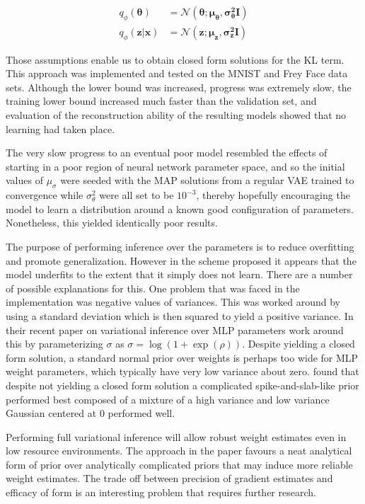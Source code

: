 \documentclass[../report.tex]{subfiles}
\begin{document}
\begin{equation}
\begin{split}
q_\phi(\mathbf{\theta}) & = \mathcal{N}(\mathbf{\theta}; \mathbf{\mu}_\mathbf{\theta}, \mathbf{\sigma^2_\theta}\mathbf{I})\\
q_\phi(\mathbf{z|x}) & = \mathcal{N}(\mathbf{z}; \mathbf{\mu}_\mathbf{z}, \mathbf{\sigma^2_z}\mathbf{I})
\end{split}
\end{equation}

Those assumptions enable us to obtain closed form solutions for the KL term. This approach was implemented and tested on the MNIST and Frey Face data sets. Although the lower bound was increased, progress was extremely slow, the training lower bound increased much faster than the validation set, and evaluation of the reconstruction ability of the resulting models showed that no learning had taken place. 

The very slow progress to an eventual poor model resembled the effects of starting in a poor region of neural network parameter space,%
and so the initial values of $\mu_\sigma$ were seeded with the MAP solutions from a regular VAE trained to convergence while $\sigma_\theta^2$ were all set to be $10^{-3}$, thereby hopefully encouraging the model to learn a distribution around a known good configuration of parameters. Nonetheless, this yielded identically poor results.

The purpose of performing inference over the parameters is to reduce overfitting and promote generalization. However in the scheme proposed it appears that the model underfits to the extent that it simply does not learn. There are a number of possible explanations for this. One problem that was faced in the implementation was negative values of variances. This was worked around by using a standard deviation which is then squared to yield a positive variance. In their recent paper on variational inference over MLP parameters \cite{blundell2015weight} work around this by parameterizing $\sigma$ as $\sigma = \log(1 + \exp(\rho))$. Despite yielding a closed form solution, a standard normal prior over weights is perhaps too wide for MLP weight parameters, which typically have very low variance about zero. \cite{blundell2015weight} found that despite not yielding a closed form solution a complicated spike-and-slab-like prior performed best composed of a mixture of a high variance and low variance Gaussian centered at 0 performed well.

Performing full variational inference will allow robust weight estimates even in low resource environments. The approach in the paper favours a neat analytical form of prior over analytically complicated priors that may induce more reliable weight estimates. The trade off between precision of gradient estimates and efficacy of form is an interesting problem that requires further research.
\end{document}
